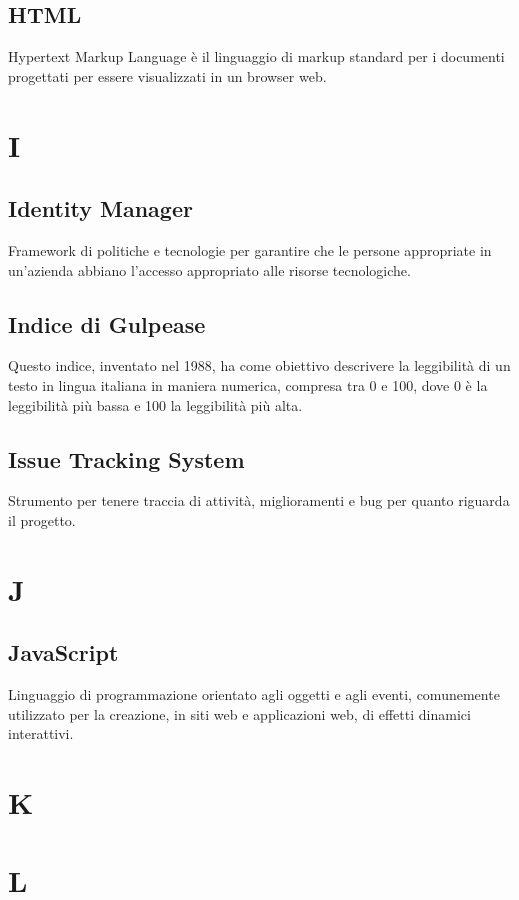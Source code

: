 \subsection*{HTML}
Hypertext Markup Language è il linguaggio di markup standard per i documenti progettati per essere visualizzati in un browser web.

\newpage
\section{I}
\subsection*{Identity Manager}
Framework di politiche e tecnologie per garantire che le persone appropriate in un'azienda abbiano l'accesso appropriato alle risorse tecnologiche.

\subsection*{Indice di Gulpease}
Questo indice, inventato nel 1988, ha come obiettivo descrivere la leggibilità di un
testo in lingua italiana in maniera numerica, compresa tra 0 e 100, dove 0 è la leggibilità più
bassa e 100 la leggibilità più alta.

\subsection*{Issue Tracking System}
Strumento per tenere traccia di attività, miglioramenti e bug per quanto riguarda il progetto.

\newpage
\section{J}
\subsection*{JavaScript}
Linguaggio di programmazione orientato agli oggetti e agli eventi, comunemente utilizzato per la creazione, in siti web e applicazioni web, di effetti dinamici interattivi.

\newpage
\section{K}


\newpage
\section{L}
